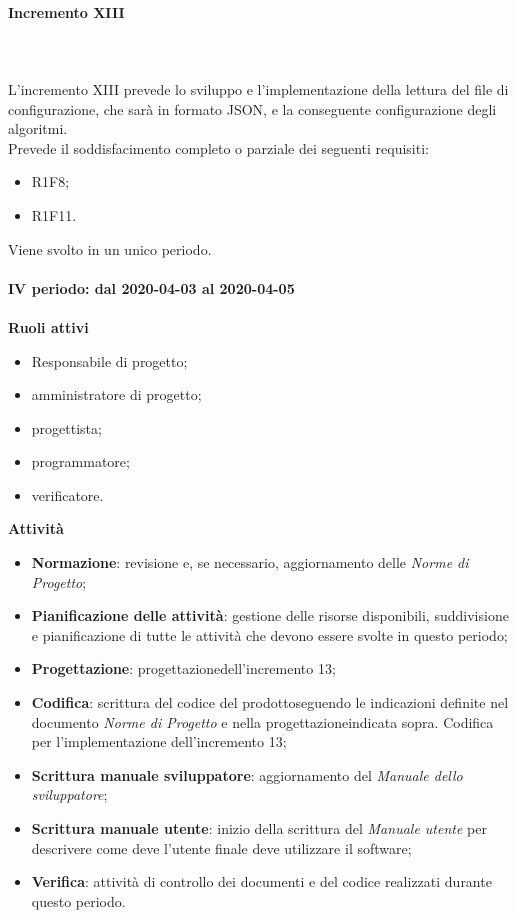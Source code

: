 \paragraph{Incremento XIII} \mbox{} \\ \\
L'incremento XIII prevede lo sviluppo e l'implementazione della lettura del file di configurazione, che sarà in formato JSON, e la conseguente configurazione degli algoritmi.
\\Prevede il soddisfacimento completo o parziale dei seguenti requisiti:
\begin{itemize}
	\item R1F8;
	\item R1F11.
\end{itemize}
Viene svolto in un unico periodo.
\mbox{} \\ \\ \textbf{IV periodo: dal 2020-04-03 al 2020-04-05} \mbox{} \\ \\
\textbf{Ruoli attivi}
\begin{itemize}
	\item Responsabile di progetto\glo;
	\item amministratore di progetto\glo;
	\item progettista;
	\item programmatore;
	\item verificatore.
\end{itemize}
\textbf{Attività} 
\begin{itemize}
	\item \textbf{Normazione}: revisione e, se necessario, aggiornamento delle \textit{Norme di Progetto};
	\item \textbf{Pianificazione delle attività}: gestione delle risorse disponibili, suddivisione e pianificazione di tutte le attività che devono essere svolte in questo periodo;
	\item \textbf{Progettazione}\glo: progettazione\glosp dell'incremento 13;  
	\item \textbf{Codifica}: scrittura del codice del prodotto\glosp seguendo le indicazioni definite nel documento \textit{Norme di Progetto} e nella progettazione\glosp indicata sopra. Codifica per l'implementazione dell'incremento 13;
	\item \textbf{Scrittura manuale sviluppatore}: aggiornamento del \textit{Manuale dello sviluppatore};
	\item \textbf{Scrittura manuale utente}: inizio della scrittura del \textit{Manuale utente} per descrivere come deve l'utente finale deve utilizzare il software;
	\item \textbf{Verifica}: attività di controllo dei documenti e del codice realizzati durante questo periodo.
\end{itemize}
